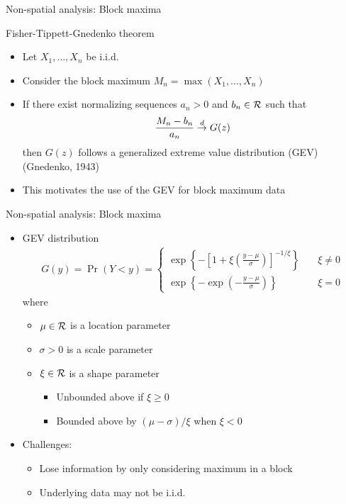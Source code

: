 \documentclass{beamer}
\begin{document}
\begin{frame}{Non-spatial analysis: Block maxima}
\begin{adjustwidth}{1em}{0em}
  Fisher-Tippett-Gnedenko theorem \vspace{1em}
  \begin{itemize} \setlength{\itemsep}{1em}
    \item Let $X_1, \ldots, X_n$ be i.i.d.
    \item Consider the block maximum $M_n = \max(X_1, \ldots, X_n)$
    \item If there exist normalizing sequences $a_n > 0$ and $b_n \in {\cal R}$ such that
    \begin{align*}
      \frac{ M_n - b_n }{ a_n } \stackrel{d}{\rightarrow} G(z)
    \end{align*}
    then $G(z)$ follows a generalized extreme value distribution (GEV) (Gnedenko, 1943)
    \item This motivates the use of the GEV for block maximum data
  \end{itemize}
\end{adjustwidth}
\end{frame}

\begin{frame}{Non-spatial analysis: Block maxima}
  \begin{itemize} \setlength{\itemsep}{1em}
    \item GEV distribution
    \begin{align*}
      G(y) = \Pr(Y < y) = \left\{  \begin{array}{ll}
        \exp\left\{ -\left[ 1 + \xi \left( \frac{ y - \mu }{ \sigma } \right) \right]^{ -1 / \xi} \right\} & \quad \xi \neq 0 \\[0.5em]
        \exp \left\{ -\exp \left( - \frac{ y - \mu }{ \sigma} \right) \right\} & \quad \xi = 0
      \end{array}\right.
    \end{align*}
    where
    \begin{itemize} \setlength{\itemsep}{0.25em}
      \item $\mu \in {\cal R}$ is a location parameter
      \item $\sigma > 0$ is a scale parameter
      \item $\xi \in {\cal R}$ is a shape parameter
      \begin{itemize}
        \item Unbounded above if $\xi \ge 0$
        \item Bounded above by $(\mu - \sigma) / \xi$ when $\xi < 0$
      \end{itemize}
    \end{itemize}
    \item Challenges:
    \begin{itemize}
      \item Lose information by only considering maximum in a block
      \item Underlying data may not be i.i.d.
    \end{itemize}
  \end{itemize}
\end{frame}
\end{document}
